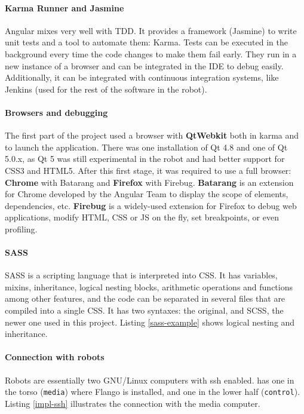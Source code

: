 \paragraph{Karma Runner and Jasmine} Angular mixes very well with \ac{TDD}. 
It provides a framework (Jasmine) to write unit tests and a tool to automate them: Karma.
Tests can be executed in the background every time the code changes to make them fail early.
They run in a new instance of a browser and can be integrated in the \ac{IDE} to debug easily.
Additionally, it can be integrated with continuous integration systems, like Jenkins (used for the rest of the software in the robot).

\paragraph{Browsers and debugging} The first part of the project used a browser with \textbf{QtWebkit} both in karma and to launch the application.
There was one installation of Qt 4.8 and one of Qt 5.0.x, as Qt 5 was still experimental in the robot and had better support for \ac{CSS3} and \ac{HTML5}.
After this first stage, it was required to use a full browser: \textbf{Chrome} with Batarang and \textbf{Firefox} with Firebug.
\textbf{Batarang} is an extension for Chrome developed by the Angular Team to display the scope of elements, dependencies, etc.
\textbf{Firebug} is a widely-used extension for Firefox to debug web applications, modify \ac{HTML}, \ac{CSS} or \ac{JS} on the fly, set breakpoints, or even profiling.

\paragraph{SASS} \ac{SASS} is a scripting language that is interpreted into \ac{CSS}.
It has variables, mixins, inheritance, logical nesting blocks, arithmetic operations and functions among other features, and the code can be separated in several files that are compiled into a single \ac{CSS}.
It has two syntaxes: the original, and \ac{SCSS}, the newer one used in this project.
Listing \ref{sass-example} shows logical nesting and inheritance.



\paragraph{Connection with robots} Robots are essentially two GNU/Linux computers with \ac{ssh} enabled.
 has one in the torso (\texttt{media}) where Flango is installed, and one in the lower half (\texttt{control}).
Listing \ref{impl-ssh} illustrates the connection with the media computer.

